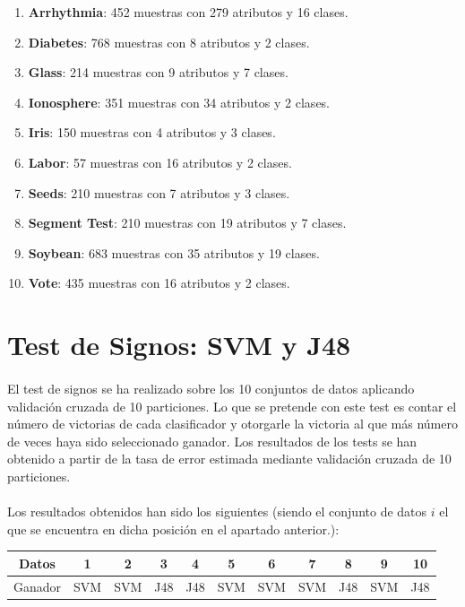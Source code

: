 \documentclass[10pt, a4paper,spanish]{article}
\begin{document}
			\begin{enumerate}
				\item \textbf{Arrhythmia}: 452 muestras con 279 atributos y 16 clases.
				\item \textbf{Diabetes}: 768 muestras con 8 atributos y 2 clases.
				\item \textbf{Glass}: 214 muestras con 9 atributos y 7 clases.
				\item \textbf{Ionosphere}: 351 muestras con 34 atributos y 2 clases.
				\item \textbf{Iris}: 150 muestras con 4 atributos y 3 clases.
				\item \textbf{Labor}: 57 muestras con 16 atributos y 2 clases.
				\item \textbf{Seeds}: 210 muestras con 7 atributos y 3 clases.
				\item \textbf{Segment Test}: 210 muestras con 19 atributos y 7 clases.
				\item \textbf{Soybean}: 683 muestras con 35 atributos y 19 clases.
				\item \textbf{Vote}: 435 muestras con 16 atributos y 2 clases.
			\end{enumerate}


	\section{Test de Signos: SVM y J48}

        \paragraph{}
		El test de signos se ha realizado sobre los 10 conjuntos de datos aplicando validación cruzada de 10 particiones. Lo que se pretende con este test es contar el número de victorias de cada clasificador y otorgarle la victoria al que más número de veces haya sido seleccionado ganador. Los resultados de los tests se han obtenido a partir de la tasa de error estimada mediante validación cruzada de 10 particiones.

		\paragraph{}
		Los resultados obtenidos han sido los siguientes (siendo el conjunto de datos $i$ el que se encuentra en dicha posición en el apartado anterior.):

		\hfill
		\begin{center}
			\begin{tabular}{ | c || c | c | c | c | c | c | c | c | c | c | }
				\hline
				Datos		& 1 	& 2		& 3 	& 4 	& 5 	& 6		& 7 	& 8 	& 9 	& 10 \\ \hline \hline
				Ganador		& SVM 	& SVM 	& J48 	& J48 	& SVM 	& SVM 	& SVM 	& J48 	& SVM 	& J48 \\
				\hline
			\end{tabular}
		\end{center}
\end{document}
